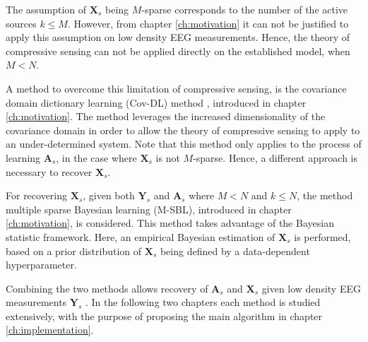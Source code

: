 The assumption of $\mathbf{X}_s$ being $M$-sparse corresponds to the number of the active sources $k \leq M$. 
However, from chapter \ref{ch:motivation} it can not be justified to apply this assumption on low density EEG measurements. 
Hence, the theory of compressive sensing can not be applied directly on the established model, when $M < N$. 

A method to overcome this limitation of compressive sensing, is the covariance domain dictionary learning (Cov-DL) method \cite{Balkan2015}, introduced in chapter \ref{ch:motivation}.
The method leverages the increased dimensionality of the covariance domain in order to allow the theory of compressive sensing to apply to an under-determined system. 
Note that this method only applies to the process of learning $\mathbf{A}_s$, in the case where $\textbf{X}_s$ is not $M$-sparse. 
Hence, a different approach is necessary to recover $\mathbf{X}_s$.

For recovering $\mathbf{X}_s$, given both $\mathbf{Y}_s$ and $\mathbf{A}_s$ where $M < N$ and $k \leq N$, the method multiple sparse Bayesian learning (M-SBL)\cite{Balkan2014}, introduced in chapter \ref{ch:motivation}, is considered.
This method takes advantage of the Bayesian statistic framework. 
Here, an empirical Bayesian estimation of $\mathbf{X}_s$ is performed, based on a prior distribution of $\mathbf{X}_s$ being defined by a data-dependent hyperparameter.  

Combining the two methods allows recovery of $\mathbf{A}_s$ and $\mathbf{X}_s$ given low density EEG measurements $\mathbf{Y}_s$ \cite{phd2015}. 
In the following two chapters each method is studied extensively, with the purpose of proposing the main algorithm in chapter \ref{ch:implementation}. 





